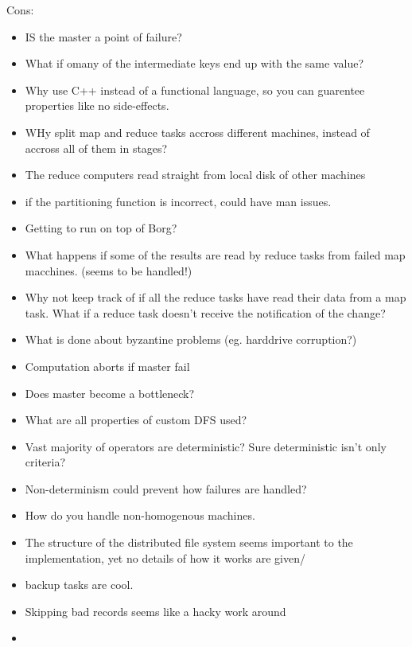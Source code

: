 \documentclass[11pt]{article}
\begin{document}
Cons:

\begin{itemize}

    \item IS the master a point of failure?

    \item What if omany of the intermediate keys end up with the same value?

    \item Why use C++ instead of a functional language, so you can guarentee properties like no side-effects.

    \item WHy split map and reduce tasks accross different machines, instead of accross all of them in stages?

    \item The reduce computers read straight from local disk of other machines

    \item if the partitioning function is incorrect, could have man issues.

    \item Getting to run on top of Borg?

    \item What happens if some of the results are read by reduce tasks from failed map macchines. (seems to be handled!)

    \item Why not keep track of if all the reduce tasks have read their data from a map task. What if a reduce task doesn't receive the notification of the change?

    \item What is done about byzantine problems (eg. harddrive corruption?)

    \item Computation aborts if master fail

    \item Does master become a bottleneck?

    \item What are all properties of custom DFS used?

    \item Vast majority of operators are deterministic? Sure deterministic isn't only criteria?

    \item Non-determinism could prevent how failures are handled?

    \item How do you handle non-homogenous machines.

    \item The structure of the distributed file system seems important to the implementation, yet no details of how it works are given/

    \item backup tasks are cool.

    \item Skipping bad records seems like a hacky work around

    \item
\end{itemize}
\end{document}
